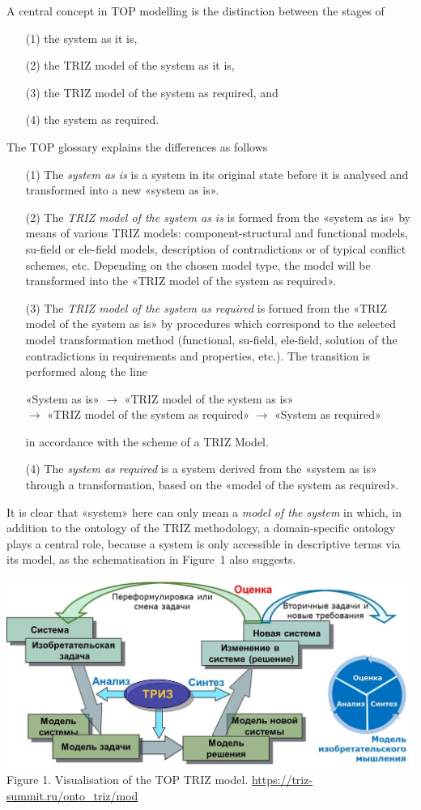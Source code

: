 \documentclass[11pt,a4paper]{article}
\begin{document}
A central concept in TOP modelling is the distinction between the stages of 
\begin{itemize}[noitemsep]
\item [(1)] the system as it is,
\item [(2)] the TRIZ model of the system as it is,
\item [(3)] the TRIZ model of the system as required, and 
\item [(4)] the system as required. 
\end{itemize}
The TOP glossary \cite{TOP-Glossary} explains the differences as follows
\begin{itemize}[noitemsep]
\item [(1)] The \emph{system as is} is a system in its original state before
  it is analysed and transformed into a new «system as is».
\item [(2)] The \emph{TRIZ model of the system as is} is formed from the
  «system as is» by means of various TRIZ models: component-structural and
  functional models, su-field or ele-field models, description of
  contradictions or of typical conflict schemes, etc. Depending on the chosen
  model type, the model will be transformed into the «TRIZ model of the system
  as required».
\item [(3)] The \emph{TRIZ model of the system as required} is formed from the
  «TRIZ model of the system as is» by procedures which correspond to the
  selected model transformation method (functional, su-field, ele-field,
  solution of the contradictions in requirements and properties, etc.). The
  transition is performed along the line
  \begin{center}
    «System as is» $\to$ «TRIZ model of the system as is»\\ $\to$ «TRIZ model
    of the system as required» $\to$ «System as required»
  \end{center}
  in accordance with the scheme of a TRIZ Model.
\item [(4)] The \emph{system as required} is a system derived from the «system
  as is» through a transformation, based on the «model of the system as
  required».
 \end{itemize}
It is clear that «system» here can only mean a \emph{model of the system} in
which, in addition to the ontology of the TRIZ methodology, a domain-specific
ontology plays a central role, because a system is only accessible in
descriptive terms via its model, as the schematisation in Figure~1 also
suggests.
\begin{center}
  \includegraphics[width=.6\textwidth]{Rubin.jpeg}\\
  Figure 1. Visualisation of the TOP TRIZ model.
  \url{https://triz-summit.ru/onto_triz/mod}
\end{center}
\end{document}
